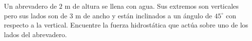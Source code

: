 \item Un abrevadero de $2 \text{ m}$ de altura se llena con agua. Sus extremos son verticales pero sus lados son de $3 \text{ m}$ de ancho y están inclinados a un ángulo de $45^\circ$ con respecto a la vertical. Encuentre la fuerza hidrostática que actúa sobre uno de los lados del abrevadero.
